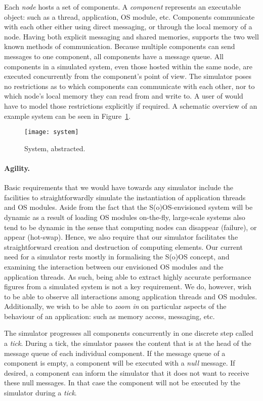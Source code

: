 Each \emph{node} hosts a set of components.
A \emph{component} represents an executable object: such as a thread, application, OS module, etc.
Components communicate with each other either using direct messaging, or through the local memory of a node.
Having both explicit messaging and shared memories, \soosim supports the two well known methods of communication.
Because multiple components can send messages to one component, all components have a message queue.
All components in a simulated system, even those hosted within the same node, are executed concurrently from the component's point of view.
The simulator poses no restrictions as to which components can communicate with each other, nor to which node's local memory they can read from and write to.
A user of \soosim would have to model those restrictions explicitly if required.
A schematic overview of an example system can be seen in Figure~\ref{fig:system}.

\begin{figure}
\centering
%
\texttt{[image: system]}
\caption{System, abstracted.}
\label{fig:system}
\end{figure}

\paragraph{Agility.}
Basic requirements that we would have towards any simulator include the facilities to straightforwardly simulate the instantiation of application threads and OS modules.
Aside from the fact that the S(o)OS-envisioned system will be dynamic as a result of loading OS modules on-the-fly, large-scale systems also tend to be dynamic in the sense that computing nodes can disappear (failure), or
appear (hot-swap).
Hence, we also require that our simulator facilitates the straightforward creation and destruction of computing elements.
Our current need for a simulator rests mostly in formalising the S(o)OS concept, and examining the interaction between our envisioned OS modules and the application threads.
As such, being able to extract highly accurate performance figures from a simulated system is not a key requirement.
We do, however, wish to be able to observe all interactions among application threads and OS modules.
Additionally, we wish to be able to \emph{zoom in} on particular aspects of the behaviour of an application: such as memory access, messaging, etc.

The simulator progresses all components concurrently in one discrete step called a \emph{tick}.
During a tick, the simulator passes the content that is at the head of the message queue of each individual component.
If the message queue of a component is empty, a component will be executed with a \emph{null} message.
If desired, a component can inform the simulator that it does not want to receive these null messages.
In that case the component will not be executed by the simulator during a \emph{tick}.


